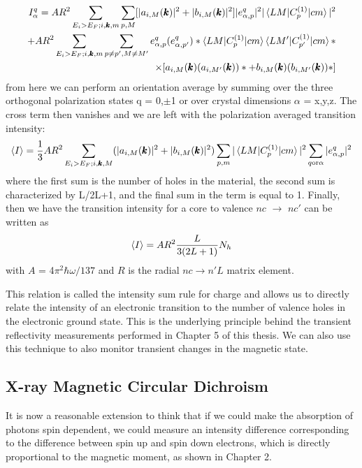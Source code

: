 \begin{align}
I_{\alpha}^q=AR^2\sum_{E_i>E_F; i ,\pmb{k}, m}\sum_{p,M}[|a_{i,M}(\pmb{k})|^2+|b_{i,M}(\pmb{k})|^2]|e_{\alpha,p}^q|^2|\braket{LM|C_p^{(1)}|cm}|^2 \\
+ AR^2\sum_{E_i>E_F; i,\pmb{k},m}\sum_{p \neq p', M \neq M'}e^q_{\alpha,p}(e^q_{\alpha,p'})*\braket{LM|C_p^{(1)}|cm}\braket{LM'|C_{p'}^{(1)}|cm}* \\
\times [a_{i,M}(\pmb{k})(a_{i,M'}(\pmb{k}))*+b_{i,M}(\pmb{k})(b_{i,M'}(\pmb{k}))*]
\end{align}
from here we can perform an orientation average by summing over the three orthogonal polarization states q = 0,$\pm$1 or over crystal dimensions $\alpha$ = x,y,z. The cross term then vanishes and we are left with the polarization averaged transition intensity:
\begin{eqnarray}
\braket{I}=\frac{1}{3}AR^2\sum_{E_i>E_F; i,\pmb{k},M}(|a_{i,M}(\pmb{k})|^2+|b_{i,M}(\pmb{k})|^2)\sum_{p,m}|\braket{LM|C_p^{(1)}|cm}|^2\sum_{q \text{or} \alpha}|e_{\alpha,p}^q|^2
\end{eqnarray}
where the first sum is the number of holes in the material, the second sum is characterized by L/2L+1, and the final sum in the term is equal to 1. Finally, then we have the transition intensity for a core to valence $nc$ $\rightarrow$ $nc'$ can be written as
\begin{equation}
\braket{I} = AR^2\frac{L}{3(2L+1)}N_h
\end{equation}
with $A$ = 4$\pi^2\hbar\omega/137$ and $R$ is the radial $nc\rightarrow n'L$ matrix element.

This relation is called the intensity sum rule for charge and allows us to directly relate the intensity of an electronic transition to the number of valence holes in the electronic ground state. This is the underlying principle behind the transient reflectivity measurements performed in Chapter 5 of this thesis. We can also use this technique to also monitor transient changes in the magnetic state.

\subsection{X-ray Magnetic Circular Dichroism}

It is now a reasonable extension to think that if we could make the absorption of photons spin dependent, we could measure an intensity difference corresponding to the difference between spin up and spin down electrons, which is directly proportional to the magnetic moment, as shown in Chapter 2.

